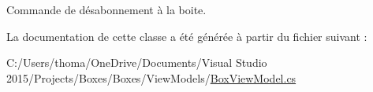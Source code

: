 Commande de désabonnement à la boite. 



La documentation de cette classe a été générée à partir du fichier suivant \+:\begin{DoxyCompactItemize}
\item 
C\+:/\+Users/thoma/\+One\+Drive/\+Documents/\+Visual Studio 2015/\+Projects/\+Boxes/\+Boxes/\+View\+Models/\hyperlink{_box_view_model_8cs}{Box\+View\+Model.\+cs}\end{DoxyCompactItemize}
